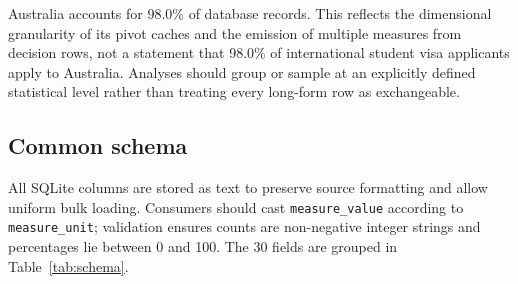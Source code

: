 \documentclass[runningheads]{llncs}
\begin{document}
Australia accounts for 98.0\% of database records. This reflects the dimensional granularity of its pivot caches and the emission of multiple measures from decision rows, not a statement that 98.0\% of international student visa applicants apply to Australia. Analyses should group or sample at an explicitly defined statistical level rather than treating every long-form row as exchangeable.

\subsection{Common schema}

All SQLite columns are stored as text to preserve source formatting and allow uniform bulk loading. Consumers should cast \texttt{measure\_value} according to \texttt{measure\_unit}; validation ensures counts are non-negative integer strings and percentages lie between 0 and 100. The 30 fields are grouped in Table~\ref{tab:schema}.
\end{document}
